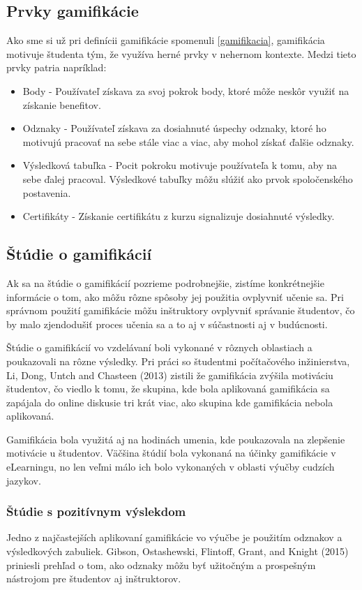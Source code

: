 \documentclass[10pt,oneside,slovak,a4paper]{article}
\begin{document}
\subsection{Prvky gamifikácie}
\label{elements}
Ako sme si už pri definícii gamifikácie spomenuli \ref{gamifikacia}, gamifikácia motivuje študenta tým, že využíva herné prvky v nehernom kontexte. Medzi tieto prvky patria napríklad:
\begin{itemize}
    \item Body - Používateľ získava za svoj pokrok body, ktoré môže neskôr využiť na získanie benefitov.
    \item Odznaky - Používateľ získava za dosiahnuté úspechy odznaky, ktoré ho motivujú pracovať na sebe stále viac a viac, aby mohol získať ďalšie odznaky.
    \item Výsledková tabuľka - Pocit pokroku motivuje používateľa k tomu, aby na sebe ďalej pracoval. Výsledkové tabuľky môžu slúžiť ako prvok spoločenského postavenia.
    \item Certifikáty - Získanie certifikátu z kurzu signalizuje dosiahnuté výsledky. 
\end{itemize}

\subsection{Štúdie o gamifikácií} \label{studies}
Ak sa na štúdie o gamifikácií pozrieme podrobnejšie, zistíme konkrétnejšie informácie o tom, ako môžu rôzne spôsoby jej použitia ovplyvniť učenie sa. Pri správnom použití gamifikácie môžu inštruktory ovplyvniť správanie študentov, čo by malo zjendodušiť proces učenia sa a to aj v súčastnosti aj v budúcnosti.~\cite{garland2015gamification}

Štúdie o gamifikácií vo vzdelávaní boli vykonané v rôznych oblastiach a poukazovali na rôzne výsledky. Pri práci so študentmi počítačového inžinierstva, Li, Dong, Untch and Chasteen (2013) zistili že gamifikácia zvýšila motiváciu študentov, čo viedlo k tomu, že skupina, kde bola aplikovaná gamifikácia sa zapájala do online diskusie tri krát viac, ako skupina kde gamifikácia nebola aplikovaná.~\cite{li2013engaging}

Gamifikácia bola využitá aj na hodinách umenia, kde poukazovala na zlepšenie motivácie u študentov. Väčšina štúdií bola vykonaná na účinky gamifikácie v eLearningu, no len veľmi málo ich bolo vykonaných v oblasti výučby cudzích jazykov.

\subsubsection{Štúdie s pozitívnym výslekdom} \label{pozit}
Jedno z najčastejších aplikovaní gamifikácie vo výučbe je použitím odznakov a výsledkových zabuliek. Gibson, Ostashewski, Flintoff, Grant, and Knight (2015) priniesli prehľad o tom, ako odznaky môžu byť užitočným a prospešným nástrojom pre študentov aj inštruktorov. ~\cite{garland2015gamification}
\end{document}

